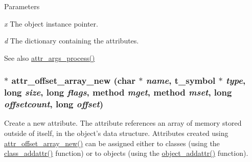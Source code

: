 \begin{DoxyParams}{Parameters}
\item[{\em x}]The object instance pointer. \item[{\em d}]The dictionary containing the attributes. \end{DoxyParams}
\begin{DoxySeeAlso}{See also}
\hyperlink{group__attr_ga6818c20859f69d6c4acd289e07340db1}{attr\_\-args\_\-process()} 
\end{DoxySeeAlso}
\hypertarget{group__attr_ga3828e337f808838f30599ae6bf01fdb9}{
\subsubsection[{attr\_\-offset\_\-array\_\-new}]{$\ast$ attr\_\-offset\_\-array\_\-new (char $\ast$ {\em name}, \/  {\bf t\_\-symbol} $\ast$ {\em type}, \/  long {\em size}, \/  long {\em flags}, \/  {\bf method} {\em mget}, \/  {\bf method} {\em mset}, \/  long {\em offsetcount}, \/  long {\em offset})}}
\label{group__attr_ga3828e337f808838f30599ae6bf01fdb9}


Create a new attribute. The attribute references an array of memory stored outside of itself, in the object's data structure. Attributes created using \hyperlink{group__attr_ga3828e337f808838f30599ae6bf01fdb9}{attr\_\-offset\_\-array\_\-new()} can be assigned either to classes (using the \hyperlink{group__class_ga2289eb7e26b552be6e015c2f9912a9ac}{class\_\-addattr()} function) or to objects (using the \hyperlink{group__attr_ga69d88788c952e914ecccd88179d0dfda}{object\_\-addattr()} function).


